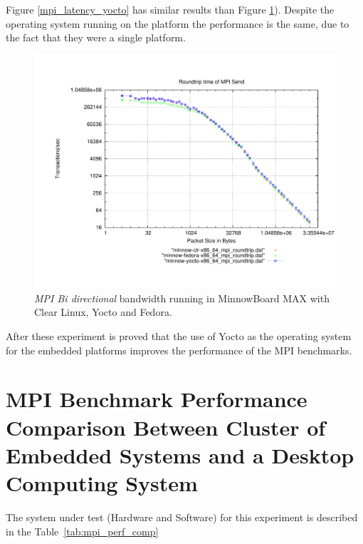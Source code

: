 Figure \ref{mpi_latency_yocto} has similar results than Figure
\ref{mpi_roundtrip_yocto}). Despite the operating system running on the platform
the performance is the same, due to the fact that they were a single platform.


\begin{figure}
  \includegraphics[width=\paperwidth]{images/mpbench_yocto_experiments/mpi_roundtrip.pdf}
\caption{\textit{MPI Bi directional} bandwidth running in  MinnowBoard MAX  with Clear Linux,
Yocto and Fedora.}
\label{mpi_roundtrip_yocto}
\end{figure}

After these experiment is proved that the use of Yocto as the operating system
for the embedded platforms improves the performance of the MPI benchmarks. 

\section{MPI Benchmark Performance Comparison Between Cluster of Embedded
Systems and a Desktop Computing System}

The system under test (Hardware and Software) for this experiment is described
in the Table~\ref{tab:mpi_perf_comp}
    
    \begin{minipage}{\textwidth}
    \end{minipage}


